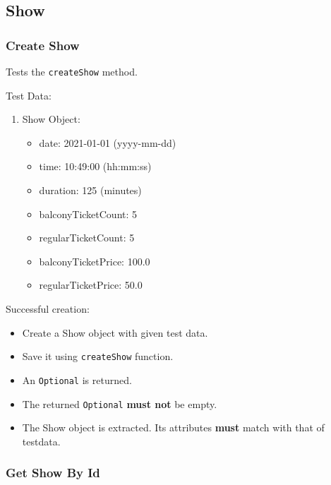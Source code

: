 \documentclass[]{article}
\providecommand{\tightlist}{%
  \setlength{\itemsep}{0pt}\setlength{\parskip}{0pt}}
\begin{document}
\hypertarget{show}{%
\subsection{Show}\label{show}}

\hypertarget{create-show}{%
\subsubsection{Create Show}\label{create-show}}

Tests the \texttt{createShow} method.

Test Data:

\begin{enumerate}
\def\labelenumi{\arabic{enumi}.}
\tightlist
\item
  Show Object:

  \begin{itemize}
  \tightlist
  \item
    date: 2021-01-01 (yyyy-mm-dd)
  \item
    time: 10:49:00 (hh:mm:ss)
  \item
    duration: 125 (minutes)
  \item
    balconyTicketCount: 5
  \item
    regularTicketCount: 5
  \item
    balconyTicketPrice: 100.0
  \item
    regularTicketPrice: 50.0
  \end{itemize}
\end{enumerate}

Successful creation:

\begin{itemize}
\tightlist
\item
  Create a Show object with given test data.
\item
  Save it using \texttt{createShow} function.
\item
  An \texttt{Optional} is returned.
\item
  The returned \texttt{Optional} \textbf{must not} be empty.
\item
  The Show object is extracted. Its attributes \textbf{must} match with
  that of testdata.
\end{itemize}

\hypertarget{get-show-by-id}{%
\subsubsection{Get Show By Id}\label{get-show-by-id}}
\end{document}
